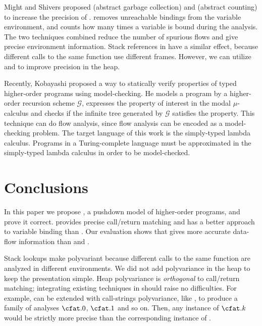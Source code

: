 \documentclass{LMCS}
\theoremstyle{definition} \newtheorem{property}[thm]{Property}
\begin{document}
Might and Shivers \cite{conf/icfp/06/might/gcfa} proposed 
\cfa{\Gamma} (abstract garbage collection) and \cfa{\mu} (abstract counting) 
to increase the precision of \kcfa.
\cfa{\Gamma} removes unreachable bindings from the variable environment,
and \cfa{\mu} counts how many times a variable is bound during the analysis.
The two techniques combined reduce the number of spurious flows and give precise
environment information.
Stack references in \cfat{} have a similar effect, because different calls to 
the same function use different frames.
However, we can utilize \cfa{\Gamma} and \cfa{\mu} to improve precision in the
heap.

Recently, Kobayashi \cite{conf/popl/09/kobayashi/hors} proposed a way to 
statically verify properties of typed higher-order programs using 
model-checking.
He models a program by a higher-order recursion scheme $\mathcal{G}$,
expresses the property of interest in the modal $\mu$-calculus
and checks if the infinite tree generated by $\mathcal{G}$ satisfies the 
property.
This technique can do flow analysis, since flow analysis can be encoded as a 
model-checking problem.
The target language of this work is the simply-typed lambda calculus.
Programs in a Turing-complete language must be approximated in the simply-typed
lambda calculus in order to be model-checked.


\section{Conclusions\label{sec:conclusions}}

\noindent In this paper we propose \cfat{}, a pushdown model of higher-order programs,
and prove it correct.
\cfat{} provides precise call/return matching 
and has a better approach to variable binding than \kcfa{}.
Our evaluation shows that \cfat{} gives more accurate data-flow
information than  and .

Stack lookups make \cfat{} polyvariant because different calls to the same 
function are analyzed in different environments.
We did not add polyvariance in the heap to keep the presentation simple.
Heap polyvariance is \emph{orthogonal} to call/return matching; integrating
existing techniques \cite{diss/cmu/91/olin, conf/ecoop/95/agesen/cpa, 
journal/toplas/98/wright/polysplit} in \cfat{} should raise no difficulties.
For example, \cfat{} can be extended with call-strings polyvariance, like \kcfa,
to produce a family of analyses $\cfat.0$, $\cfat.1$ and so on.
Then, any instance of $\cfat.k$ would be strictly more precise than the 
corresponding instance of \kcfa.
\end{document}
